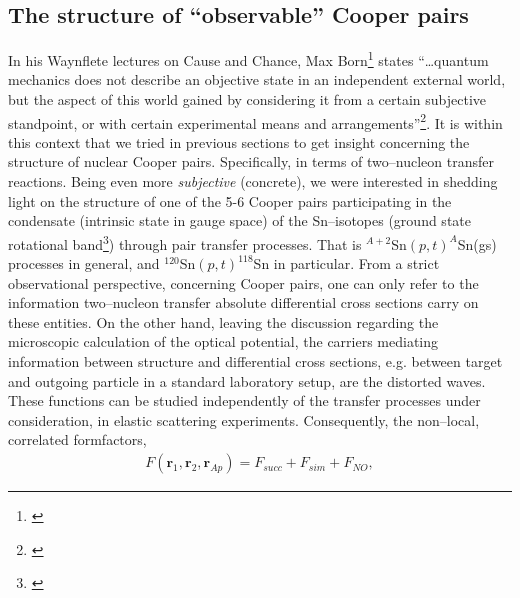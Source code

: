 \subsection{The structure of ``observable'' Cooper pairs}
In his Waynflete lectures on Cause and Chance, Max Born\footnote{\cite{Born:54,Pais:86}} states ``\dots quantum mechanics does not describe an objective state in an independent external world, but the aspect of this world gained by considering it from a certain subjective standpoint, or with certain experimental means and arrangements''\footnote{\cite{Born:48}}. It is within this context that we tried in previous sections to get insight concerning the structure of nuclear Cooper pairs. Specifically, in terms of two--nucleon transfer reactions. Being even more \textit{subjective} (concrete), we were interested in shedding light on the structure of one of the 5-6 Cooper pairs participating in the condensate (intrinsic state in gauge space) of the Sn--isotopes (ground state rotational band\footnote{\cite{Potel:13b,Potel:17}}) through pair transfer processes. That is $^{A+2}$Sn$(p,t)^{A}$Sn(gs) processes in general, and $^{120}$Sn$(p,t)^{118}$Sn in particular. From a strict observational perspective, concerning Cooper pairs, one can only refer to the information two--nucleon transfer absolute differential cross sections carry on these entities. On the other hand, leaving the discussion regarding the microscopic calculation of the optical potential, the carriers mediating information between structure and differential cross sections, e.g. between target and outgoing particle in a standard laboratory setup, are the distorted waves. These functions can be studied independently of the transfer processes under consideration, in elastic scattering experiments. Consequently, the non--local, correlated formfactors,
\begin{align}\label{eq6.6.1}
F(\mathbf r_1,\mathbf r_2,\mathbf r_{Ap})=F_{succ}+F_{sim}+F_{NO},
\end{align}
